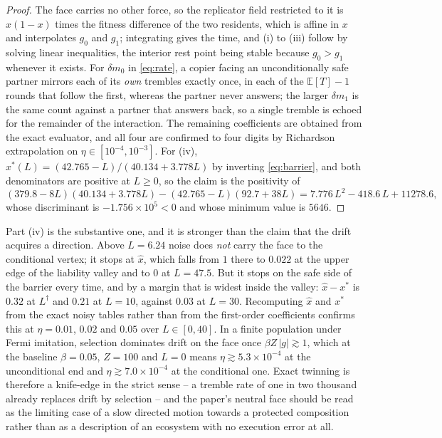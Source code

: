 \documentclass[pdflatex]{sn-jnl}
\theoremstyle{thmstyleone}
\theoremstyle{thmstylethree}
\theoremstyle{thmstyletwo}
\begin{document}
\begin{proof}
The face carries no other force, so the replicator field restricted to it is
$x(1-x)$ times the fitness difference of the two residents, which is affine in
$x$ and interpolates $g_{0}$ and $g_{1}$; integrating gives the time, and (i)
to (iii) follow by solving linear inequalities, the interior rest point being
stable because $g_{0}>g_{1}$ whenever it exists. For $\delta m_{0}$ in
\eqref{eq:rate}, a copier facing an unconditionally safe partner mirrors each
of its \emph{own} trembles exactly once, in each of the $\mathbb{E}[T]-1$
rounds that follow the first, whereas the partner never answers; the larger
$\delta m_{1}$ is the same count against a partner that answers back, so a
single tremble is echoed for the remainder of the interaction. The remaining
coefficients are obtained from the exact evaluator, and all four are confirmed
to four digits by Richardson extrapolation on $\eta\in[10^{-4},10^{-3}]$. For
(iv), $x^{*}(L)=(42.765-L)/(40.134+3.778L)$ by inverting \eqref{eq:barrier},
and both denominators are positive at $L\ge0$, so the claim is the positivity
of
\begin{equation}
(379.8-8L)(40.134+3.778L)-(42.765-L)(92.7+38L)
  =7.776\,L^{2}-418.6\,L+11278.6,
\label{eq:margin}
\end{equation}
whose discriminant is $-1.756\times10^{5}<0$ and whose minimum value is
$5646$.
\end{proof}

Part (iv) is the substantive one, and it is stronger than the claim that the
drift acquires a direction. Above $L=6.24$ noise does \emph{not} carry the
face to the conditional vertex; it stops at $\hat x$, which falls from $1$
there to $0.022$ at the upper edge of the liability valley and to $0$ at
$L=47.5$. But it stops on the safe side of the barrier every time, and by a
margin that is widest inside the valley: $\hat x-x^{*}$ is $0.32$ at
$L^{\dagger}$ and $0.21$ at $L=10$, against $0.03$ at $L=30$. Recomputing
$\hat x$ and $x^{*}$ from the exact noisy tables rather than from the
first-order coefficients confirms this at $\eta=0.01$, $0.02$ and $0.05$ over
$L\in[0,40]$. In a finite population under Fermi imitation, selection
dominates drift on the face once $\beta Z\,|g|\gtrsim1$, which at the baseline
$\beta=0.05$, $Z=100$ and $L=0$ means $\eta\gtrsim5.3\times10^{-4}$ at the
unconditional end and $\eta\gtrsim7.0\times10^{-4}$ at the conditional one.
Exact twinning is therefore a knife-edge in the strict sense -- a tremble rate
of one in two thousand already replaces drift by selection -- and the paper's
neutral face should be read as the limiting case of a slow directed motion
towards a protected composition rather than as a description of an ecosystem
with no execution error at all.
\end{document}
